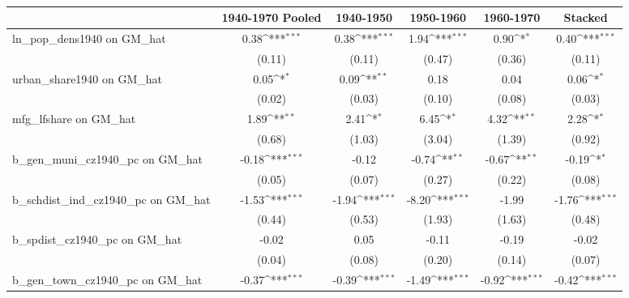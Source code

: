 \begin{table}[htbp]\centering
\def\sym#1{\ifmmode^{#1}\else\(^{#1}\)\fi}
\caption{}
\begin{tabular}{l*{5}{c}}
\toprule
                &\multicolumn{1}{c}{1940-1970 Pooled}&\multicolumn{1}{c}{1940-1950}&\multicolumn{1}{c}{1950-1960}&\multicolumn{1}{c}{1960-1970}&\multicolumn{1}{c}{Stacked}\\
\midrule
ln\_pop\_dens1940 on GM\_hat&     0.38\sym{***}&     0.38\sym{***}&     1.94\sym{***}&     0.90\sym{*}  &     0.40\sym{***}\\
                &   (0.11)         &   (0.11)         &   (0.47)         &   (0.36)         &   (0.11)         \\
\addlinespace
urban\_share1940 on GM\_hat&     0.05\sym{*}  &     0.09\sym{**} &     0.18         &     0.04         &     0.06\sym{*}  \\
                &   (0.02)         &   (0.03)         &   (0.10)         &   (0.08)         &   (0.03)         \\
\addlinespace
mfg\_lfshare on GM\_hat&     1.89\sym{**} &     2.41\sym{*}  &     6.45\sym{*}  &     4.32\sym{**} &     2.28\sym{*}  \\
                &   (0.68)         &   (1.03)         &   (3.04)         &   (1.39)         &   (0.92)         \\
\addlinespace
b\_gen\_muni\_cz1940\_pc on GM\_hat&    -0.18\sym{***}&    -0.12         &    -0.74\sym{**} &    -0.67\sym{**} &    -0.19\sym{*}  \\
                &   (0.05)         &   (0.07)         &   (0.27)         &   (0.22)         &   (0.08)         \\
\addlinespace
b\_schdist\_ind\_cz1940\_pc on GM\_hat&    -1.53\sym{***}&    -1.94\sym{***}&    -8.20\sym{***}&    -1.99         &    -1.76\sym{***}\\
                &   (0.44)         &   (0.53)         &   (1.93)         &   (1.63)         &   (0.48)         \\
\addlinespace
b\_spdist\_cz1940\_pc on GM\_hat&    -0.02         &     0.05         &    -0.11         &    -0.19         &    -0.02         \\
                &   (0.04)         &   (0.08)         &   (0.20)         &   (0.14)         &   (0.07)         \\
\addlinespace
b\_gen\_town\_cz1940\_pc on GM\_hat&    -0.37\sym{***}&    -0.39\sym{***}&    -1.49\sym{***}&    -0.92\sym{***}&    -0.42\sym{***}\\

\end{tabular}
\end{table}
